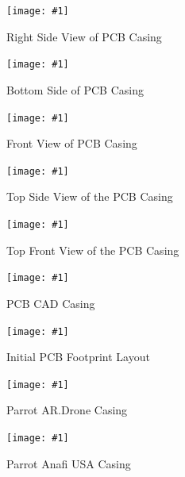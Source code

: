 \documentclass[12pt]{article}
\newcommand{\quickfigure}[4]{%
\begin{figure}[!htbp]
\centering
\texttt{[image: \#1]}
\caption{#3}
\label{#4}
\end{figure}%
}
\begin{document}
\quickfigure{images/right-side-of-PCB-casing.png}{15cm}{Right Side View of PCB Casing}{right-side-view-pcb-casing}

\quickfigure{images/bottom-side-of-PCB-casing.png}{15cm}{Bottom Side of PCB Casing}{bottom-side-pcb-casing}

\quickfigure{images/front-view-of-PCB-casing.png}{15cm}{Front View of PCB Casing}{front-view-pcb-casing}

\quickfigure{images/top-view-PCB-casing-open.png}{15cm}{Top Side View of the PCB Casing}{top-side-view-pcb-casing}

\quickfigure{images/top-front-view-PCB-casing-open.png}{15cm}{Top Front View of the PCB Casing}{top-front-view-pcb-casing}


\quickfigure{images/PCB-CAD-drawing.png}{15cm}{PCB CAD Casing}{pcb-cad-casing}

\quickfigure{images/initial-PCB-footprint-layout.png}{15cm}{Initial PCB Footprint Layout}{initial-pcb-footprint-layout}

\quickfigure{images/parrot-AR-drone-casing.jpg}{15cm}{Parrot AR.Drone Casing}{parrot-ardrone-casing}

\quickfigure{images/parrot-anafi-USA-casing.jpg}{15cm}{Parrot Anafi USA Casing}{parrot-anafi-usa-casing}
\end{document}
